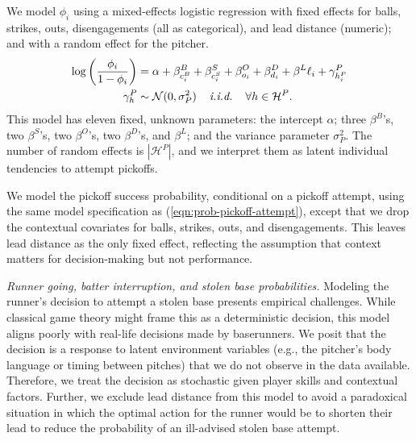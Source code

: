 \documentclass[aoas]{imsart}
\begin{document}
      We model $\phi_i$ using a mixed-effects logistic regression with fixed effects for balls, strikes, outs, disengagements (all as categorical), and lead distance (numeric); and with a random effect for the pitcher.
      \begin{align}
        \label{eqn:prob-pickoff-attempt}
        \begin{split}
          \log\left(\frac{\phi_i}{1 - \phi_i}\right) &= \alpha + \beta^B_{c_i^B} + \beta^S_{c_i^S} +
            \beta^O_{o_i} + \beta^D_{d_i} + \beta^L \ell_i + \gamma^P_{h_i^P}\\
          \gamma^P_{h} &\sim \mathcal{N}(0, \sigma^2_P) \hspace{4mm} \mbox{\it i.i.d.} \hspace{4mm} \forall h \in \mathcal{H}^P.
        \end{split}
      \end{align}
      This model has eleven fixed, unknown parameters: the intercept $\alpha$; three $\beta^B$'s, two $\beta^S$'s, two $\beta^O$'s, two $\beta^D$'s, and $\beta^L$; and the variance parameter $\sigma^2_P$. The number of random effects is $|\mathcal{H}^P|$, and we interpret them as latent individual tendencies to attempt pickoffs.
        
      We model the pickoff success probability, conditional on a pickoff attempt, using the same model specification as (\ref{eqn:prob-pickoff-attempt}), except that we drop the contextual covariates for balls, strikes, outs, and disengagements. This leaves lead distance as the only fixed effect, reflecting the assumption that context matters for decision-making but not performance.

      \textit{Runner going, batter interruption, and stolen base probabilities.} Modeling the runner's decision to attempt a stolen base presents empirical challenges. While classical game theory might frame this as a deterministic decision, this model aligns poorly with real-life decisions made by baserunners. We posit that the decision is a response to latent environment variables (e.g., the pitcher's body language or timing between pitches) that we do not observe in the data available. Therefore, we treat the decision as stochastic given player skills and contextual factors. Further, we exclude lead distance from this model to avoid a paradoxical situation in which the optimal action for the runner would be to shorten their lead to reduce the probability of an ill-advised stolen base attempt.
\end{document}
